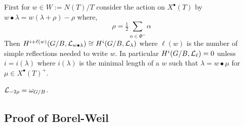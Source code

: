 \documentclass[12pt]{article}
\begin{document}
\begin{theorem}[Bott]
First for $w \in W := N(T)/T$ consider the action on $X^\bullet(T)$ by $w \bullet \lambda = w (\lambda + \rho) - \rho$ where,
\[ \rho = \tfrac{1}{2} \sum_{\alpha \in \Phi^+} \alpha \]
Then $H^{i + \ell(w)}(G/B, \mathcal{L}_{w \bullet \lambda}) \cong H^i(G/B, \mathcal{L}_\lambda)$ where $\ell(w)$ is the number of simple reflections needed to write $w$. In particular $H^i(G/B, \mathcal{L}_\ell) = 0$ unless $i = i(\lambda)$ where $i(\lambda)$ is the minimal length of a $w$ such that $\lambda = w \bullet \mu$ for $\mu \in X^\bullet(T)^+$. 
\end{theorem}

\begin{rmk}
$\mathcal{L}_{-2 \rho} = \omega_{G/B}$. 
\end{rmk}

\subsection{Proof of Borel-Weil}
\end{document}
